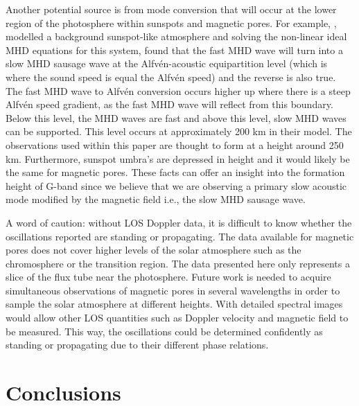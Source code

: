 	Another potential source is from mode conversion that will occur at the lower region of the photosphere within sunspots and magnetic pores.
	For example, \cite{0004-637X-746-1-68}, modelled a background sunspot-like atmosphere and solving the non-linear ideal MHD equations for this system, found that the fast MHD wave will turn into a slow MHD sausage wave at the Alfv\'en-acoustic equipartition level (which is where the sound speed is equal the Alfv\'en speed) and the reverse is also true.
	The fast MHD wave to Alfv\'en conversion occurs higher up where there is a steep Alfv\'en speed gradient, as the fast MHD wave will reflect from this boundary.
	Below this level, the MHD waves are fast and above this level, slow MHD waves can be supported.
	This level occurs at approximately 200 km in their model.
	The observations used within this paper are thought to form at a height around 250 km.
	Furthermore, sunspot umbra's are depressed in height and it would likely be the same for magnetic pores.
	These facts can offer an insight into the formation height of G-band since we believe that we are observing a primary slow acoustic mode modified by the magnetic field i.e., the slow MHD sausage wave.
	    
    A word of caution: without LOS Doppler data, it is difficult to know whether the oscillations reported are standing or propagating.
    The data available for magnetic pores does not cover higher levels of the solar atmosphere such as the chromosphere or the transition region.
    The data presented here only represents a slice of the flux tube near the photosphere.
    Future work is needed to acquire simultaneous observations of magnetic pores in several wavelengths in order to sample the solar atmosphere at different heights.
    With detailed spectral images would allow other LOS quantities such as Doppler velocity and magnetic field to be measured.
    This way, the oscillations could be determined confidently as standing or propagating due to their different phase relations. 
    
    \section{Conclusions}
    \label{conc}
    
